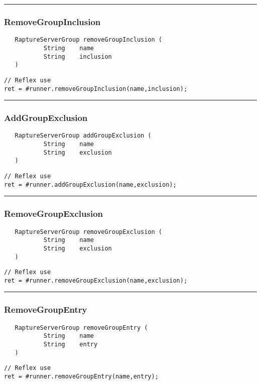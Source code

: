 \rule{15cm}{2pt}
\subsubsection{RemoveGroupInclusion}
\label{Api:RemoveGroupInclusion}
\begin{verbatim}
   RaptureServerGroup removeGroupInclusion (
           String    name
           String    inclusion
   )
\end{verbatim}
\begin{lstlisting}[language=reflex]
// Reflex use
ret = #runner.removeGroupInclusion(name,inclusion);
\end{lstlisting}



\rule{15cm}{2pt}
\subsubsection{AddGroupExclusion}
\label{Api:AddGroupExclusion}
\begin{verbatim}
   RaptureServerGroup addGroupExclusion (
           String    name
           String    exclusion
   )
\end{verbatim}
\begin{lstlisting}[language=reflex]
// Reflex use
ret = #runner.addGroupExclusion(name,exclusion);
\end{lstlisting}



\rule{15cm}{2pt}
\subsubsection{RemoveGroupExclusion}
\label{Api:RemoveGroupExclusion}
\begin{verbatim}
   RaptureServerGroup removeGroupExclusion (
           String    name
           String    exclusion
   )
\end{verbatim}
\begin{lstlisting}[language=reflex]
// Reflex use
ret = #runner.removeGroupExclusion(name,exclusion);
\end{lstlisting}



\rule{15cm}{2pt}
\subsubsection{RemoveGroupEntry}
\label{Api:RemoveGroupEntry}
\begin{verbatim}
   RaptureServerGroup removeGroupEntry (
           String    name
           String    entry
   )
\end{verbatim}
\begin{lstlisting}[language=reflex]
// Reflex use
ret = #runner.removeGroupEntry(name,entry);
\end{lstlisting}



